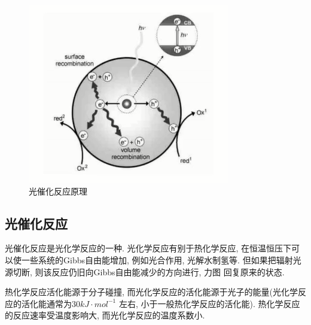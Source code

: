 \documentclass[a4paper]{article}
\begin{document}
\begin{figure}[H]
	\centering
	\includegraphics[width = 0.4\paperwidth]{fig/principle.png}
	\caption{光催化反应原理}
\end{figure}
\par
\subsection{光催化反应}
光催化反应是光化学反应的一种. 光化学反应有别于热化学反应, 在恒温恒压下可以使一些系统的Gibbs自由能增加, 
例如光合作用, 光解水制氢等. 但如果把辐射光源切断, 则该反应仍旧向Gibbs自由能减少的方向进行, 力图
回复原来的状态. \par
热化学反应活化能源于分子碰撞, 而光化学反应的活化能源于光子的能量(光化学反应的活化能通常为$30kJ\cdot mol^{-1}$
左右, 小于一般热化学反应的活化能). 热化学反应的反应速率受温度影响大, 而光化学反应的温度系数小. \par 
\end{document}
